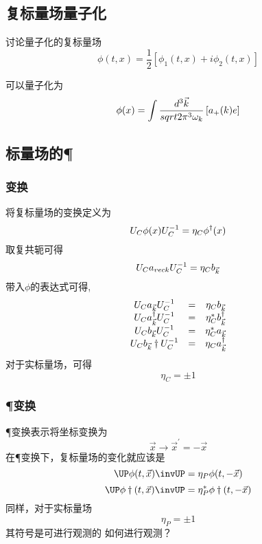 \subsection{复标量场量子化}
讨论量子化的复标量场
\begin{equation}
    \phi(t, x) = \frac 1  2 [\phi_1(t, x) + i\phi_2(t, x)]
\end{equation}

可以量子化为
\begin{equation}
    \phi(x) = \int \frac{d^3\vec{k}}{sqrt{2\pi^3}\omega_{k}} \left[a_+(k)e\right]
\end{equation}

\subsection{标量场的\C \P \T}
\subsubsection{\C 变换}
将复标量场的\C 变换定义为
\begin{equation}
    U_{C}\phi(x)U_{C}^{-1} = \eta_C\phi^\dagger(x)
\end{equation}
取复共轭可得
\begin{equation}
    U_{C} a_{vec k}U_{C}^{-1} = \eta_C b_{\vec k}
\end{equation}
带入$\phi$的表达式可得,
\begin{equation}
    \begin{array}{ccc}
        U_{C} a_{\vec k} U_{C}^{-1} &=& \eta_C b_{\vec k} \\
        U_{C} a_{\vec k}^\dagger U_{C}^{-1} &=& \eta_C^* b_{\vec k}^\dagger \\
        U_{C} b_{\vec k} U_{C}^{-1} &=& \eta_C^* a_{\vec k} \\
        U_{C} b_{\vec k}\dagger U_{C}^{-1} &=& \eta_C a_{\vec k}^\dagger \\
    \end{array}
\end{equation}
对于实标量场，可得
\begin{equation}
    \eta_C = \pm 1
\end{equation}
\subsubsection{\P 变换}
\P 变换表示将坐标变换为
\begin{equation}
    \vec x \rightarrow \vec x^\prime = -\vec x
\end{equation}
在\P 变换下，复标量场的变化就应该是
\begin{equation}
    \UP\phi(t,\vec x)\invUP = \eta_P\phi(t,-\vec x)
\end{equation}
\begin{equation}
    \UP\phi\dagger(t,\vec x)\invUP = \eta_P^*\phi\dagger(t,-\vec x)
\end{equation}
同样，对于实标量场
\begin{equation}
    \eta_P = \pm 1
\end{equation}
其符号是可进行观测的
如何进行观测？
